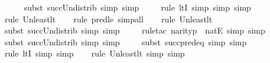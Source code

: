 \begin{isabellebody}
\ \ \ \ \isamarkupfalse%
{\isacharparenleft}{\kern0pt}subst\ succ{\isacharunderscore}{\kern0pt}Un{\isacharunderscore}{\kern0pt}distrib{\isacharcomma}{\kern0pt}\ simp{\isacharcomma}{\kern0pt}\ simp{\isacharparenright}{\kern0pt}\isanewline
\ \ \ \ \isamarkupfalse%
{\isacharparenleft}{\kern0pt}rule\ ltI{\isacharcomma}{\kern0pt}\ simp{\isacharcomma}{\kern0pt}\ simp{\isacharcomma}{\kern0pt}\ simp{\isacharparenright}{\kern0pt}\isanewline
\ \ \isamarkupfalse%
{\isacharparenleft}{\kern0pt}rule\ Un{\isacharunderscore}{\kern0pt}least{\isacharunderscore}{\kern0pt}lt{\isacharparenright}{\kern0pt}\isanewline
\ \ \ \isamarkupfalse%
{\isacharparenleft}{\kern0pt}rule\ pred{\isacharunderscore}{\kern0pt}le{\isacharcomma}{\kern0pt}\ simp{\isacharunderscore}{\kern0pt}all{\isacharparenright}{\kern0pt}\isanewline
\ \ \ \isamarkupfalse%
{\isacharparenleft}{\kern0pt}rule\ Un{\isacharunderscore}{\kern0pt}least{\isacharunderscore}{\kern0pt}lt{\isacharparenright}{\kern0pt}\isanewline
\ \ \ \ \isamarkupfalse%
{\isacharparenleft}{\kern0pt}subst\ succ{\isacharunderscore}{\kern0pt}Un{\isacharunderscore}{\kern0pt}distrib{\isacharcomma}{\kern0pt}\ simp{\isacharcomma}{\kern0pt}\ simp{\isacharparenright}{\kern0pt}\isanewline
\ \ \ \ \isamarkupfalse%
{\isacharparenleft}{\kern0pt}rule{\isacharunderscore}{\kern0pt}tac\ n{\isacharequal}{\kern0pt}{\isachardoublequoteopen}arity{\isacharparenleft}{\kern0pt}p{\isacharparenright}{\kern0pt}{\isachardoublequoteclose}\ \ natE{\isacharcomma}{\kern0pt}\ simp{\isacharcomma}{\kern0pt}\ simp{\isacharparenright}{\kern0pt}\isanewline
\ \ \ \ \isamarkupfalse%
{\isacharparenleft}{\kern0pt}subst\ succ{\isacharunderscore}{\kern0pt}Un{\isacharunderscore}{\kern0pt}distrib{\isacharcomma}{\kern0pt}\ simp{\isacharcomma}{\kern0pt}\ simp{\isacharparenright}{\kern0pt}\isanewline
\ \ \ \ \isamarkupfalse%
{\isacharparenleft}{\kern0pt}subst\ succ{\isacharunderscore}{\kern0pt}pred{\isacharunderscore}{\kern0pt}eq{\isacharcomma}{\kern0pt}\ simp{\isacharcomma}{\kern0pt}\ simp{\isacharparenright}{\kern0pt}\isanewline
\ \ \ \ \isamarkupfalse%
{\isacharparenleft}{\kern0pt}rule\ ltI{\isacharcomma}{\kern0pt}\ simp{\isacharcomma}{\kern0pt}\ simp{\isacharparenright}{\kern0pt}\isanewline
\ \ \ \isamarkupfalse%
{\isacharparenleft}{\kern0pt}rule\ Un{\isacharunderscore}{\kern0pt}least{\isacharunderscore}{\kern0pt}lt{\isacharcomma}{\kern0pt}\ simp{\isacharcomma}{\kern0pt}\ simp{\isacharparenright}{\kern0pt}\isanewline

\end{isabellebody}
